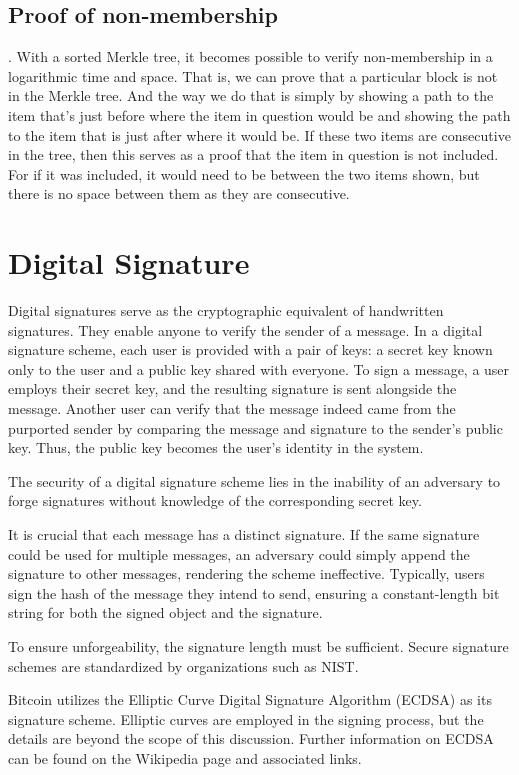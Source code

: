 \subsection*{Proof of non‐membership}.
With a sorted Merkle tree, it becomes possible to verify non‐membership in a logarithmic time and space. That is, we can prove that a particular block is not in the Merkle tree. And the way we do that is simply by showing a path to the item that’s just before where the item in question would be and showing the path to the item that is just after where it would be. If these two items are consecutive in the tree, then this serves as a proof that the item in question is not included. For if it was included, it would need to be between the two items shown, but there is no space between them as they are consecutive.
\section{Digital Signature}
Digital signatures serve as the cryptographic equivalent of handwritten signatures. They enable anyone to verify the sender of a message. In a digital signature scheme, each user is provided with a pair of keys: a secret key known only to the user and a public key shared with everyone.
To sign a message, a user employs their secret key, and the resulting signature is sent alongside the message. Another user can verify that the message indeed came from the purported sender by comparing the message and signature to the sender's public key. Thus, the public key becomes the user's identity in the system.

The security of a digital signature scheme lies in the inability of an adversary to forge signatures without knowledge of the corresponding secret key.

It is crucial that each message has a distinct signature. If the same signature could be used for multiple messages, an adversary could simply append the signature to other messages, rendering the scheme ineffective. Typically, users sign the hash of the message they intend to send, ensuring a constant-length bit string for both the signed object and the signature.

To ensure unforgeability, the signature length must be sufficient. Secure signature schemes are standardized by organizations such as NIST.

Bitcoin utilizes the Elliptic Curve Digital Signature Algorithm (ECDSA) as its signature scheme. Elliptic curves are employed in the signing process, but the details are beyond the scope of this discussion. Further information on ECDSA can be found on the Wikipedia page and associated links.

